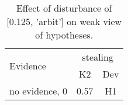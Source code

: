 \begin{table}\begin{tabular}{l|cc}\toprule\multirow{2}{*}{Evidence} & \multicolumn{2}{c}{stealing}\\& {K2} & {Dev}\\\midrule
no evidence, 0 & \cellcolor{Bittersweet}0.57&\cellcolor{Bittersweet}H1\\\bottomrule\end{tabular}\caption{Effect of disturbance of [0.125, 'arbit'] on weak view of hypotheses.}\end{table}